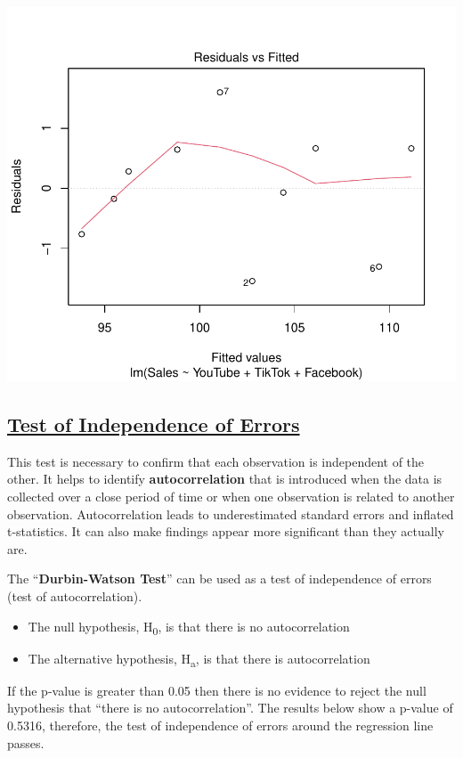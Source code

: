 \documentclass[
]{article}
\begin{document}
\includegraphics{2_multiple_linear_regression_files/figure-latex/test_of_linearity-1.pdf}

\subsection{\texorpdfstring{\ul{\textbf{Test of Independence of
Errors}}}{Test of Independence of Errors}}\label{test-of-independence-of-errors}

This test is necessary to confirm that each observation is independent
of the other. It helps to identify \textbf{autocorrelation} that is
introduced when the data is collected over a close period of time or
when one observation is related to another observation. Autocorrelation
leads to underestimated standard errors and inflated t-statistics. It
can also make findings appear more significant than they actually are.

The ``\textbf{Durbin-Watson Test}'' can be used as a test of
independence of errors (test of autocorrelation).

\begin{itemize}
\item
  The null hypothesis, H\textsubscript{0}, is that there is no
  autocorrelation
\item
  The alternative hypothesis, H\textsubscript{a}, is that there is
  autocorrelation
\end{itemize}

If the p-value is greater than 0.05 then there is no evidence to reject
the null hypothesis that ``there is no autocorrelation''. The results
below show a p-value of 0.5316, therefore, the test of independence of
errors around the regression line passes.
\end{document}
